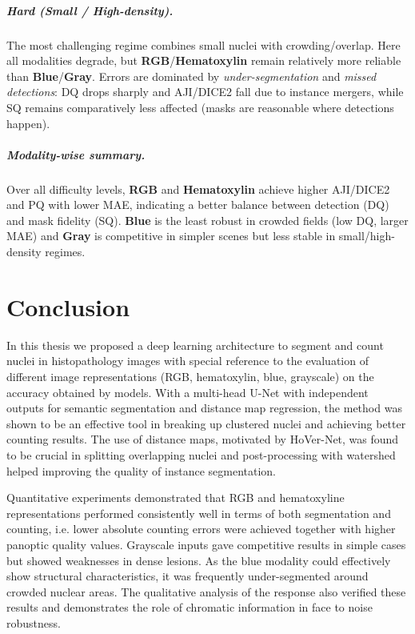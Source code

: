 \documentclass[target=bach,aauheader=,style=]{thud}
\begin{document}
\paragraph{Hard (Small / High-density).}
The most challenging regime combines small nuclei with crowding/overlap. Here all modalities degrade, but \textbf{RGB}/\textbf{Hematoxylin} remain relatively more reliable than \textbf{Blue}/\textbf{Gray}. Errors are dominated by \emph{under-segmentation} and \emph{missed detections}: DQ drops sharply and AJI/DICE2 fall due to instance mergers, while SQ remains comparatively less affected (masks are reasonable where detections happen).

\paragraph{Modality-wise summary.}
Over all difficulty levels, \textbf{RGB} and \textbf{Hematoxylin} achieve higher AJI/DICE2 and PQ with lower MAE, indicating a better balance between detection (DQ) and mask fidelity (SQ). \textbf{Blue} is the least robust in crowded fields (low DQ, larger MAE) and \textbf{Gray} is competitive in simpler scenes but less stable in small/high-density regimes.



\chapter{Conclusion}
\label{sec:conclusions}

In this thesis we proposed a deep learning architecture to segment and count nuclei in histopathology images with special reference to the evaluation of different image representations (RGB, hematoxylin, blue, grayscale) on the accuracy obtained by models. With a multi-head U-Net with independent outputs for semantic segmentation and distance map regression, the method was shown to be an effective tool in breaking up clustered nuclei and achieving better counting results. The use of distance maps, motivated by HoVer-Net, was found to be crucial in splitting overlapping nuclei and post-processing with watershed helped improving the quality of instance segmentation.

Quantitative experiments demonstrated that RGB and hematoxyline representations performed consistently well in terms of both segmentation and counting, i.e. lower absolute counting errors were achieved together with higher panoptic quality values. Grayscale inputs gave competitive results in simple cases but showed weaknesses in dense lesions. As the blue modality could effectively show structural characteristics, it was frequently under-segmented around crowded nuclear areas. The qualitative analysis of the response also verified these results and demonstrates the role of chromatic information in face to noise robustness.
\end{document}
